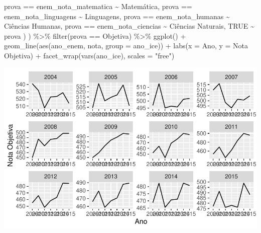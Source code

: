 \documentclass[
  letterpaper,
  DIV=11,
  numbers=noendperiod]{scrartcl}
\newenvironment{Shaded}{\begin{snugshade}}{\end{snugshade}}
\newcommand{\AttributeTok}[1]{\textcolor[rgb]{0.40,0.45,0.13}{#1}}
\newcommand{\ConstantTok}[1]{\textcolor[rgb]{0.56,0.35,0.01}{#1}}
\newcommand{\FunctionTok}[1]{\textcolor[rgb]{0.28,0.35,0.67}{#1}}
\newcommand{\NormalTok}[1]{\textcolor[rgb]{0.00,0.23,0.31}{#1}}
\newcommand{\SpecialCharTok}[1]{\textcolor[rgb]{0.37,0.37,0.37}{#1}}
\newcommand{\StringTok}[1]{\textcolor[rgb]{0.13,0.47,0.30}{#1}}
\begin{document}
\begin{Shaded}
\begin{Highlighting}[]
\NormalTok{      prova }\SpecialCharTok{==} \StringTok{\textquotesingle{}enem\_nota\_matematica\textquotesingle{}} \SpecialCharTok{\textasciitilde{}} \StringTok{\textquotesingle{}Matemática\textquotesingle{}}\NormalTok{,}
\NormalTok{      prova }\SpecialCharTok{==} \StringTok{\textquotesingle{}enem\_nota\_linguagens\textquotesingle{}} \SpecialCharTok{\textasciitilde{}} \StringTok{\textquotesingle{}Linguagens\textquotesingle{}}\NormalTok{,}
\NormalTok{      prova }\SpecialCharTok{==} \StringTok{\textquotesingle{}enem\_nota\_humanas\textquotesingle{}} \SpecialCharTok{\textasciitilde{}} \StringTok{\textquotesingle{}Ciências Humanas\textquotesingle{}}\NormalTok{,}
\NormalTok{      prova }\SpecialCharTok{==} \StringTok{\textquotesingle{}enem\_nota\_ciencias\textquotesingle{}} \SpecialCharTok{\textasciitilde{}} \StringTok{\textquotesingle{}Ciências Naturais\textquotesingle{}}\NormalTok{,}
      \ConstantTok{TRUE} \SpecialCharTok{\textasciitilde{}}\NormalTok{ prova}
\NormalTok{    )}
\NormalTok{  ) }\SpecialCharTok{\%\textgreater{}\%}
  \FunctionTok{filter}\NormalTok{(prova }\SpecialCharTok{==} \StringTok{\textquotesingle{}Objetiva\textquotesingle{}}\NormalTok{) }\SpecialCharTok{\%\textgreater{}\%} 
  \FunctionTok{ggplot}\NormalTok{() }\SpecialCharTok{+}
  \FunctionTok{geom\_line}\NormalTok{(}\FunctionTok{aes}\NormalTok{(ano\_enem, nota, }\AttributeTok{group =}\NormalTok{ ano\_ice)) }\SpecialCharTok{+}
  \FunctionTok{labs}\NormalTok{(}\AttributeTok{x =} \StringTok{\textquotesingle{}Ano\textquotesingle{}}\NormalTok{, }\AttributeTok{y =} \StringTok{\textquotesingle{}Nota Objetiva\textquotesingle{}}\NormalTok{) }\SpecialCharTok{+}
  \FunctionTok{facet\_wrap}\NormalTok{(}\FunctionTok{vars}\NormalTok{(ano\_ice), }\AttributeTok{scales =} \StringTok{"free"}\NormalTok{)}
\end{Highlighting}
\end{Shaded}

\includegraphics{script_files/figure-latex/unnamed-chunk-11-1.pdf}
\end{document}

